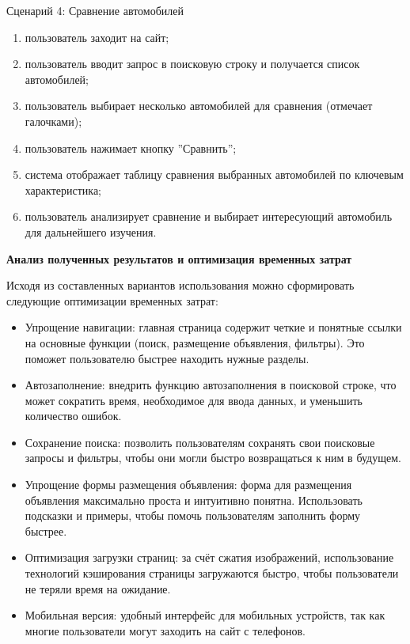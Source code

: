 Сценарий 4: Сравнение автомобилей

\begin{enumerate}
    \item пользователь заходит на сайт;
    \item пользователь вводит запрос в поисковую строку и получается список автомобилей;
    \item пользователь выбирает несколько автомобилей для сравнения (отмечает галочками);
    \item пользователь нажимает кнопку ”Сравнить”;
    \item система отображает таблицу сравнения выбранных автомобилей по ключевым характеристика;
    \item пользователь анализирует сравнение и выбирает интересующий автомобиль для дальнейшего изучения.
\end{enumerate}
\bigskip

\textbf{Анализ полученных результатов и оптимизация временных затрат}

Исходя из составленных вариантов использования можно сформировать следующие оптимизации временных затрат:

\begin{itemize}
    \item Упрощение навигации: главная страница содержит четкие и понятные ссылки на основные функции (поиск, размещение объявления, фильтры). Это поможет пользователю быстрее находить нужные разделы.
    \item Автозаполнение: внедрить функцию автозаполнения в поисковой строке, что может сократить время, необходимое для ввода данных, и уменьшить количество ошибок.
    \item Сохранение поиска: позволить пользователям сохранять свои поисковые запросы и фильтры, чтобы они могли быстро возвращаться к ним в будущем.
    \item Упрощение формы размещения объявления: форма для размещения объявления максимально проста и интуитивно понятна. Использовать подсказки и примеры, чтобы помочь пользователям заполнить форму быстрее.
    \item Оптимизация загрузки страниц: за счёт сжатия изображений, использование технологий кэширования страницы загружаются быстро, чтобы пользователи не теряли время на ожидание.
    \item Мобильная версия: удобный интерфейс для мобильных устройств, так как многие пользователи могут заходить на сайт с телефонов.
\end{itemize}
\bigskip


